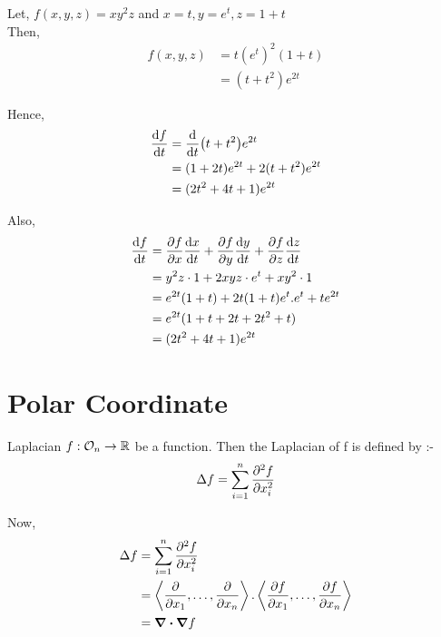 \documentclass[../Analysis-3]{subfiles}
\begin{document}
\begin{Eg}{}{}
    Let, $f(x,y,z) = xy^{2}z$ and $x=t, y=e^t, z= 1+t$ \\
    Then, \begin{align*}
        f(x,y,z) & = t(e^t)^2(1+t) \\
                 & = (t+t^2)e^{2t}
    \end{align*}

    Hence, \begin{align*}
        \dv{f}{t} & = \dv{t}(t+t^2)e^{2t}           \\
                  & = (1+2t)e^{2t} + 2(t+t^2)e^{2t} \\
                  & = (2t^2+4t+1)e^{2t}
    \end{align*}

    Also, \begin{align*}
        \dv{f}{t} & = \pdv{f}{x} \dv{x}{t} + \pdv{f}{y} \dv{y}{t} + \pdv{f}{z} \dv{z}{t} \\
                  & = y^2z\cdot 1 + 2xyz\cdot e^t + xy^2\cdot 1                          \\
                  & = e^{2t}(1+t) + 2t(1+t)e^t.e^t + te^{2t}                             \\
                  & = e^{2t}(1+t+2t+2t^2+t)                                              \\
                  & = (2t^2+4t+1)e^{2t}
    \end{align*}
\end{Eg}


\section{Polar Coordinate}

\begin{Def}{Laplacian}{}
    $f : \mathcal{O}_{n} \to \mathbb{R}$ be a function. Then the Laplacian of f is defined by :- \[ \Delta f = \sum_{i = 1}^{n} \pdv[2]{f}{x_i}   \]
\end{Def}

Now, \begin{align*}
    \Delta f & = \sum_{i=1}^{n} \pdv[2]{f}{x_i}                                                                                               \\
             & = \left\langle \pdv{}{x_1}, \ldots, \pdv{}{x_n}  \right\rangle. \left\langle \pdv{f}{x_1}, \ldots, \pdv{f}{x_n}  \right\rangle \\
             & = \div\grad f
\end{align*}
\end{document}
